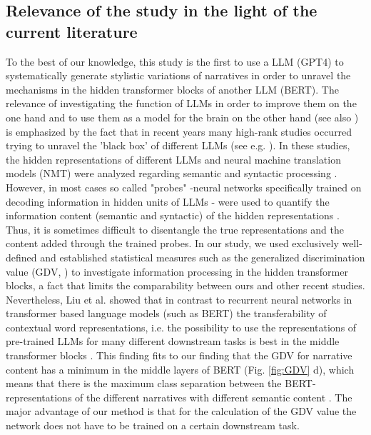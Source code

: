 \subsection*{Relevance of the study in the light of the current literature}
To the best of our knowledge, this study is the first to use a LLM (GPT4) to systematically generate stylistic variations of narratives in order to unravel the mechanisms in the hidden transformer blocks of another LLM (BERT). The relevance of investigating the function of LLMs in order to improve them on the one hand and to use them as a model for the brain on the other hand (see also \cite{lamarre2022attention, kriegeskorte2018cognitive, schilling2023auditory}) is emphasized by the fact that in recent years many high-rank studies occurred trying to unravel the 'black box' of different LLMs (see e.g. \cite{valeriani2024geometry, hewitt2019structural, belinkov2018evaluating, liu2019linguistic, tenney2019bert, rogers2021primer, ma2019universal}). In these studies, the hidden representations of different LLMs and neural machine translation models (NMT) were analyzed regarding semantic \cite{belinkov2018evaluating, liu2019linguistic, tenney2019bert, rogers2021primer} and syntactic processing \cite{hewitt2019structural}. However, in most cases so called "probes" -neural networks specifically trained on decoding information in hidden units of LLMs \cite{conneau2018you, hupkes2018visualisation} - were used to quantify the information content (semantic and syntactic) of the hidden representations \cite{valeriani2024geometry, hewitt2019structural}. Thus, it is sometimes difficult to disentangle the true representations and the content added through the trained probes. In our study, we used exclusively well-defined and established statistical measures such as the generalized discrimination value (GDV, \cite{schilling2021quantifying}) to investigate information processing in the hidden transformer blocks, a fact that limits the comparability between ours and other recent studies. Nevertheless, Liu et al. showed that in contrast to recurrent neural networks in transformer based language models (such as BERT) the transferability of contextual word representations, i.e. the possibility to use the representations of pre-trained LLMs for many different downstream tasks \cite{chiang2022transferability} is best in the middle transformer blocks \cite{liu2019linguistic}. This finding fits to our finding that the GDV for narrative content has a minimum in the middle layers of BERT (Fig. \ref{fig:GDV} d), which means that there is the maximum class separation between the BERT-representations of the different narratives with different semantic content \cite{liu2019linguistic}. The major advantage of our method is that for the calculation of the GDV value the network does not have to be trained on a certain downstream task.

